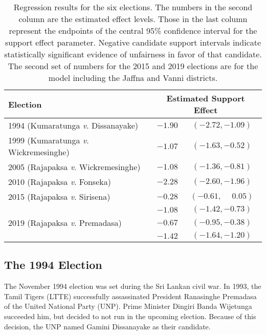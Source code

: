 \begin{table}[t]\centering
\begin{small}
\begin{tabular}{lrc}
{\bf Election} & \multicolumn{2}{c}{{\bf Estimated Support Effect}\phantom{X}} \\
\midrule
1994 (Kumaratunga \textit{v}. Dissanayake) 	& $-1.90$ & $(-2.72, -1.09)$ \\[1ex]
1999 (Kumaratunga \textit{v}. Wickremesinghe) & $-1.07$ & $(-1.63, -0.52)$ \\[1ex]
2005 (Rajapaksa   \textit{v}. Wickremesinghe) & $-1.08$ & $(-1.36, -0.81)$ \\[1ex]
2010 (Rajapaksa   \textit{v}. Fonseka) 		& $-2.28$ & $(-2.60, -1.96)$ \\[1ex]
2015 (Rajapaksa   \textit{v}. Sirisena) 	& $-0.28$ & $(-0.61, \phantom{-}0.05)$ \\
                                            & $-1.08$ & $(-1.42, -0.73)$ \\[1ex]
2019 (Rajapaksa   \textit{v}. Premadasa) 	& $-0.67$ & $(-0.95, -0.38)$ \\
                                            & $-1.42$ & $(-1.64, -1.20)$ \\
\end{tabular}
\end{small}
\caption[Regression results for the six elections]{Regression results for the six elections. The numbers in the second column are the estimated effect levels. Those in the last column represent the endpoints of the central 95\% confidence interval for the support effect parameter. Negative candidate support intervals indicate statistically significant evidence of unfairness in favor of that candidate. The second set of numbers for the 2015 and 2019 elections are for the model including the Jaffna and Vanni districts.}
\label{tab:sri-resultsTable}
\end{table}













\subsection{The 1994 Election}
The November 1994 election was set during the Sri Lankan civil war. In 1993, the Tamil Tigers (LTTE) successfully assassinated President Ranasinghe Premadasa of the United National Party (UNP). Prime Minister Dingiri Banda Wijetunga succeeded him, but decided to not run in the upcoming election. Because of this decision, the UNP named Gamini Dissanayake as their candidate.\cite{hensman-2010}

